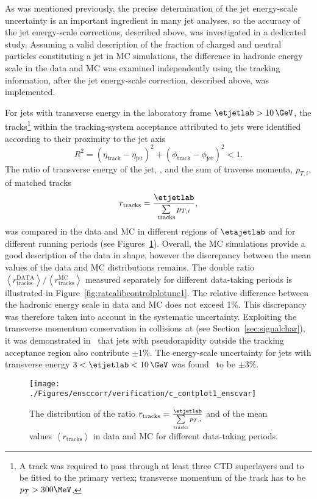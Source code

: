 As was mentioned previously, the precise determination of the jet energy-scale uncertainty is an important ingredient in many jet analyses, so the accuracy of the jet energy-scale corrections, described above, was investigated in a dedicated study. Assuming a valid description of the fraction of charged and neutral particles constituting a jet in MC simulations, the difference in hadronic energy scale in the data and MC was examined independently using the tracking information, after the jet energy-scale correction, described above, was implemented. 

For jets with transverse energy in the laboratory frame $\etjetlab > 10\,\GeV$, the tracks\footnote{A track was required to pass through at least three CTD superlayers and to be fitted to the primary vertex; transverse momentum of the track has to be $p_T > 300 \MeV$.} within the tracking-system acceptance attributed to jets were identified according to their proximity to the jet axis
\begin{equation}
R^2 = \left(\eta_{\mathrm{track}} - \eta_{\mathrm{jet}}\right)^2 + \left(\phi_{\mathrm{track}} - \phi_{\mathrm{jet}}\right)^2 < 1.
\label{eq:rtrackjetcut}
\end{equation}
The ratio of transverse energy of the jet, \etjetlab, and the sum of traverse momenta, $p_{T,i}$, of matched tracks 
\begin{equation}
r_\text{tracks} = \frac{\etjetlab}{\sum\limits_{\text{tracks}}{p_{T,i}}},
\end{equation}
was compared in the data and MC in different regions of $\etajetlab$ and for different running periods (see Figures~\ref{fig:ratcalibcontrolplotunc}). Overall, the MC simulations provide a good description of the data in shape, however the discrepancy between the mean values of the data and MC distributions remains. The double ratio $\left<r_\text{tracks}^\text{DATA}\right>/\left<r_\text{tracks}^\text{MC}\right>$ measured separately for different data-taking periods is illustrated in Figure~\ref{fig:ratcalibcontrolplotunc1}. The relative difference between the hadronic energy scale in data and MC does not exceed 1\%. This discrepancy was therefore taken into account in the systematic uncertainty. Exploiting the transverse momentum conservation in \ep collisions at \hera (see Section~\ref{sec:signalchar}), it was demonstrated in~\cite{thesis:behr:2010,thesis:perrey:2011} that jets with pseudorapidity outside the tracking acceptance region also contribute $\pm 1\%$. The energy-scale uncertainty for jets with transverse energy $3<\etjetlab<10\,\GeV$ was found~\cite{thesis:behr:2010} to be $\pm 3\%$.
\begin{figure}[h!]
	\centering
		\texttt{[image: ./Figures/ensccorr/verification/c\_contplot1\_enscvar]} 
	\caption{The distribution of the ratio $r_\text{tracks} = \frac{\etjetlab}{\sum\limits_{\text{tracks}}{p_{T,i}}}$ and of the mean values $\left\langle r_\text{tracks}\right\rangle$ in data and MC for different data-taking periods.}
	\label{fig:ratcalibcontrolplotunc}
\end{figure}

